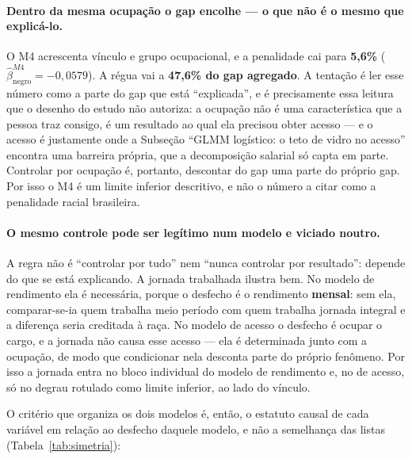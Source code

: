 \documentclass[11pt, a4paper, oneside]{article}
\begin{document}
\paragraph{Dentro da mesma ocupação o gap encolhe --- o que não é o mesmo que explicá-lo.}
O M4 acrescenta vínculo e grupo ocupacional, e a penalidade cai para
\textbf{5,6\%} ($\hat\beta_{\text{negro}}^{M4} = −0,0579$). A régua vai a
\textbf{47,6\% do gap agregado}. A tentação é ler esse número como a parte do
gap que está ``explicada'', e é precisamente essa leitura que o desenho do estudo
não autoriza: a ocupação não é uma característica que a pessoa traz consigo, é um
resultado ao qual ela precisou obter acesso --- e o acesso é justamente onde a
Subseção ``GLMM logístico: o teto de vidro no acesso'' encontra uma barreira própria, que a decomposição
salarial só capta em parte. Controlar por
ocupação é, portanto, descontar do gap uma parte do próprio gap. Por isso o M4 é um
limite inferior descritivo, e não o número a citar como a penalidade racial brasileira.

\paragraph{O mesmo controle pode ser legítimo num modelo e viciado noutro.}
A regra não é ``controlar por tudo'' nem ``nunca controlar por resultado'': depende do
que se está explicando. A jornada trabalhada ilustra bem. No modelo de rendimento ela
é {necessária}, porque o desfecho é o rendimento \textbf{mensal}: sem ela,
comparar-se-ia quem trabalha meio período com quem trabalha jornada integral e a
diferença seria creditada à raça. No modelo de acesso o desfecho é {ocupar} o
cargo, e a jornada não causa esse acesso --- ela é determinada junto com a ocupação,
de modo que condicionar nela desconta parte do próprio fenômeno. Por isso a jornada
entra no bloco individual do modelo de rendimento e, no de acesso, só no degrau
rotulado como limite inferior, ao lado do vínculo.

O critério que organiza os dois modelos é, então, o {estatuto causal} de cada
variável em relação ao desfecho daquele modelo, e não a semelhança das listas
(Tabela~\ref{tab:simetria}):
\end{document}
